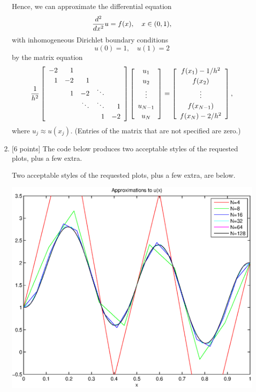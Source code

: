 \begin{solution}
\begin{enumerate}
Hence, we can approximate the differential equation
\[ {d^2 \over dx^2} u = f(x), \quad x\in (0,1),\]
with inhomogeneous Dirichlet boundary conditions
      \[ u(0)=1,\quad  u(1)=2\]
by the matrix equation
\[ {1\over h^2} \left[\begin{array}{rrrrr}
              -2 & 1 \\[0.25em]
               1 & -2 & 1 \\
                 &  1  & -2 & \ddots \\
                 & & \ddots & \ddots & 1 \\[0.25em]
                 & & & 1 & -2 
               \end{array}\right]
          \left[\begin{array}{c} u_1 \\[0.25em] u_2 \\[0.25em] \vdots \\[0.25em] u_{N-1} \\[0.25em] u_N \end{array}\right]
 =   \left[\begin{array}{c} f(x_1)-1/h^2 \\[0.25em] f(x_2) \\[0.25em] \vdots \\[0.25em] f(x_{N-1}) \\[0.25em] f(x_N)-2/h^2 \end{array}\right],\]
where $u_j \approx u(x_j)$.  (Entries of the matrix that are not specified are zero.)
\\
\item {[6 points]} The code below produces two acceptable styles of the requested plots, plus a few extra.



Two acceptable styles of the  requested plots, plus a few extra, are below.

\begin{center}
\includegraphics[scale=0.7]{together_d}
\end{center}


\end{enumerate}
\end{solution}
